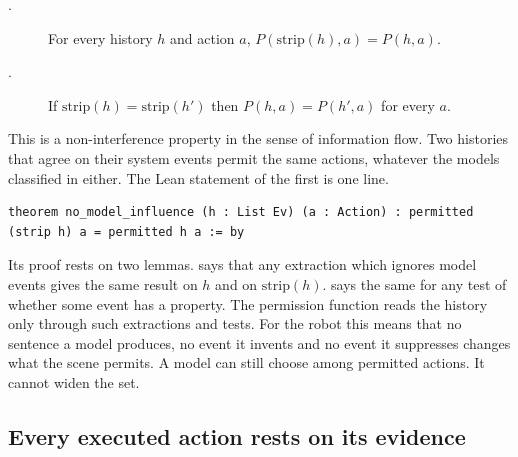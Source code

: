 \begin{description}
  \item[.] For every history $h$ and action $a$,
  $P(\mathrm{strip}(h), a) = P(h, a)$.
  \item[.] If $\mathrm{strip}(h) = \mathrm{strip}(h')$ then
  $P(h, a) = P(h', a)$ for every $a$.
\end{description}
This is a non-interference property in the sense of information flow.
Two histories that agree on their system events permit the same actions, whatever the models
classified in either.
The Lean statement of the first is one line.
\begin{lstlisting}[style=lean]
theorem no_model_influence (h : List Ev) (a : Action) : permitted (strip h) a = permitted h a := by
\end{lstlisting}
Its proof rests on two lemmas.
 says that any extraction which ignores model events gives the same
result on $h$ and on $\mathrm{strip}(h)$.
 says the same for any test of whether some event has a property.
The permission function reads the history only through such extractions and tests.
For the robot this means that no sentence a model produces, no event it invents and no event it
suppresses changes what the scene permits.
A model can still choose among permitted actions.
It cannot widen the set.

\subsection{Every executed action rests on its evidence}

